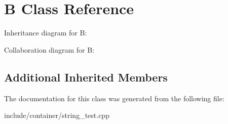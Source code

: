 \hypertarget{classB}{}\section{B Class Reference}
\label{classB}


Inheritance diagram for B\+:


Collaboration diagram for B\+:
\subsection*{Additional Inherited Members}


The documentation for this class was generated from the following file\+:\begin{DoxyCompactItemize}
\item 
include/container/string\+\_\+test.\+cpp\end{DoxyCompactItemize}
